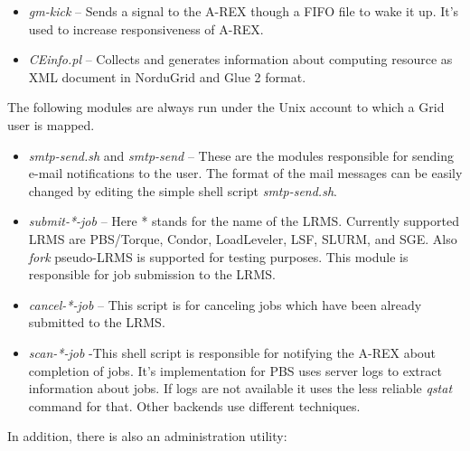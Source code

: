 \documentclass{article}                            %
\begin{document}


\begin{itemize}
\item \emph{gm-kick} -- Sends a signal to the A-REX though a FIFO file to
wake it up. It's used to increase responsiveness of A-REX.
\item \emph{CEinfo.pl} -- Collects and generates information about computing
resource as XML document in NorduGrid and Glue 2 format.
\end{itemize}

The following modules are always run under the Unix account to which
a Grid user is mapped.

\begin{itemize}
\item \textit{smtp-send.sh} and \textit{smtp-send} -- These are the modules
responsible for sending e-mail notifications to the user. The format
of the mail messages can be easily changed by editing the simple shell
script \textit{smtp-send.sh}. 
\item \textit{submit-{*}-job} -- Here {*} stands for the name of the LRMS.
Currently supported LRMS are PBS/Torque, Condor, LoadLeveler, LSF, SLURM,
and SGE. Also \emph{fork} pseudo-LRMS is supported for testing purposes.
This module is responsible for job submission to the LRMS.
\item \textit{cancel-{*}-job} -- This script is for canceling jobs which
have been already submitted to the LRMS.
\item \textit{scan-{*}-job} -This shell script is responsible for notifying
the A-REX about completion of jobs. It's implementation for PBS uses
server logs to extract information about jobs. If logs are not available
it uses the less reliable \emph{qstat} command for that. Other backends
use different techniques.
\end{itemize}

In addition, there is also an administration utility:
\end{document}
